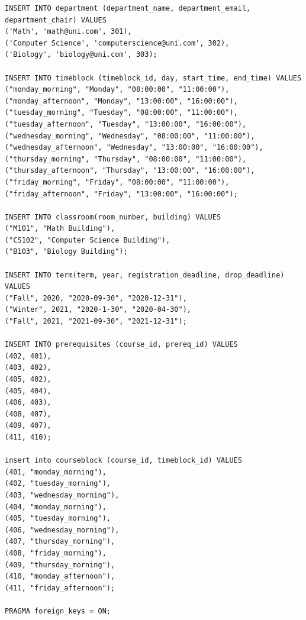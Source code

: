 \documentclass{report}
\begin{document}
\begin{lstlisting}
INSERT INTO department (department_name, department_email, department_chair) VALUES
('Math', 'math@uni.com', 301),
('Computer Science', 'computerscience@uni.com', 302),
('Biology', 'biology@uni.com', 303);

INSERT INTO timeblock (timeblock_id, day, start_time, end_time) VALUES
("monday_morning", "Monday", "08:00:00", "11:00:00"),
("monday_afternoon", "Monday", "13:00:00", "16:00:00"),
("tuesday_morning", "Tuesday", "08:00:00", "11:00:00"),
("tuesday_afternoon", "Tuesday", "13:00:00", "16:00:00"),
("wednesday_morning", "Wednesday", "08:00:00", "11:00:00"),
("wednesday_afternoon", "Wednesday", "13:00:00", "16:00:00"),
("thursday_morning", "Thursday", "08:00:00", "11:00:00"),
("thursday_afternoon", "Thursday", "13:00:00", "16:00:00"),
("friday_morning", "Friday", "08:00:00", "11:00:00"),
("friday_afternoon", "Friday", "13:00:00", "16:00:00");

INSERT INTO classroom(room_number, building) VALUES
("M101", "Math Building"),
("CS102", "Computer Science Building"),
("B103", "Biology Building");

INSERT INTO term(term, year, registration_deadline, drop_deadline) VALUES
("Fall", 2020, "2020-09-30", "2020-12-31"),
("Winter", 2021, "2020-1-30", "2020-04-30"),
("Fall", 2021, "2021-09-30", "2021-12-31");

INSERT INTO prerequisites (course_id, prereq_id) VALUES
(402, 401),
(403, 402),
(405, 402),
(405, 404),
(406, 403),
(408, 407),
(409, 407),
(411, 410);

insert into courseblock (course_id, timeblock_id) VALUES
(401, "monday_morning"),
(402, "tuesday_morning"),
(403, "wednesday_morning"),
(404, "monday_morning"),
(405, "tuesday_morning"),
(406, "wednesday_morning"),
(407, "thursday_morning"),
(408, "friday_morning"),
(409, "thursday_morning"),
(410, "monday_afternoon"),
(411, "friday_afternoon");

PRAGMA foreign_keys = ON;
\end{lstlisting}
\end{document}
